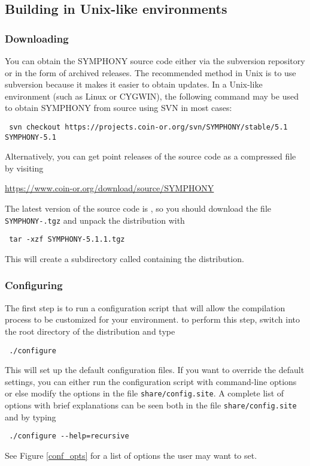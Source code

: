 \subsection{Building in Unix-like environments}
\label{getting_started_unix}

\subsubsection{Downloading}

You can obtain the SYMPHONY source code either via the subversion repository
or in the form of archived releases. The recommended method in Unix is to use
subversion because it makes it easier to obtain updates. In a Unix-like
environment (such as Linux or CYGWIN), the following command may be used to
obtain SYMPHONY from source using SVN in most cases: {\color{Brown}
\begin{verbatim}
 svn checkout https://projects.coin-or.org/svn/SYMPHONY/stable/5.1 SYMPHONY-5.1
\end{verbatim}
}
Alternatively, you can get point releases of the source code as a compressed
file by visiting
\begin{center}
 \url{https://www.coin-or.org/download/source/SYMPHONY}
\end{center}
The latest version of the source code is \VER, so you should download the file
{\color{Brown}\texttt{SYMPHONY-\VER.tgz}} and unpack the distribution with 
{\color{Brown}
\begin{verbatim}
 tar -xzf SYMPHONY-5.1.1.tgz
\end{verbatim}
} 
This will create a subdirectory called  containing
the distribution.

\subsubsection{Configuring}\label{configuring}

The first step is to run a configuration script that will allow the
compilation process to be customized for your environment. to perform this
step, switch into the root directory of the distribution and type
{\color{Brown}
\begin{verbatim}
 ./configure 
\end{verbatim}
} This will set up the default configuration files. If you want to override
the default settings, you can either run the configuration script with
command-line options or else modify the options in the file
{\color{Brown}\texttt{share/config.site}}. A complete list of options with
brief explanations can be seen both in the file
{\color{Brown}\texttt{share/config.site}} and by typing 
{\color{Brown}
\begin{verbatim}
 ./configure --help=recursive 
\end{verbatim}
}
See Figure \ref{conf_opts} for a list of options the user may want to set. 

